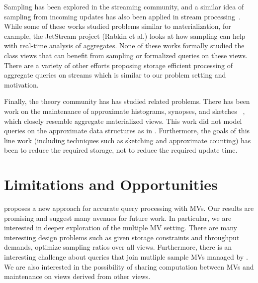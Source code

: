 Sampling has been explored in the streaming community, and a similar idea of sampling from incoming updates has also been applied in stream processing~\cite{tatbul2003load, Garofalakis, rabkin2014aggregation}.
While some of these works studied problems similar to materialization, for example, the JetStream project (Rabkin et al.) looks at how sampling can help with real-time analysis of aggregates.
None of these works formally studied the class views that can benefit from sampling or formalized queries on these views.
There are a variety of other efforts proposing storage efficient processing of aggregate queries on streams \cite{dobra2002processing, greenwald2001space} which is similar to our problem setting and motivation.

Finally, the theory community has has studied related problems.
There has been work on the maintenance of approximate histograms, synopses, and sketches ~\cite{gibbons1997fast, DBLP:journals/ftdb/CormodeGHJ12}, which closely resemble aggregate materialized views.
This work did not model queries on the approximate data structures as in \svc.
Furthermore, the goals of this line work (including techniques such as sketching and approximate counting) has been to reduce the required storage, not to reduce the required update time.
\vspace{-1em}
\section{Limitations and Opportunities}\vspace{-.3em}\label{sec:disc}
\svc proposes a new approach for accurate query processing with MVs.
Our results are promising and suggest many avenues for future work.
In particular, we are interested in deeper exploration of the multiple MV setting.
There are many interesting design problems such as given storage constraints and throughput demands, optimize sampling ratios over all views.
Furthermore, there is an interesting challenge about queries that join mutliple sample MVs managed by \svc.
We are also interested in the possibility of sharing computation between MVs and maintenance on views derived from other views.

